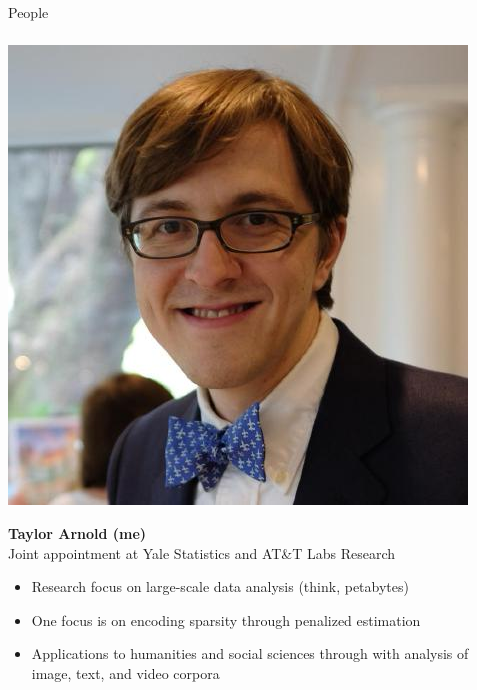 \begin{frame}[fragile] \frametitle{}

\begin{flushright}
{\color{yaleblue}\sc\fontsize{1cm}{0cm}\selectfont People}
\end{flushright}

\end{frame}

\begin{frame}[fragile] \frametitle{}

\noindent
\begin{minipage}{0.4\textwidth}
\includegraphics[width=0.9\linewidth]{img/arnold.jpeg}
\end{minipage}%
\begin{minipage}{0.6\textwidth}
{\bf Taylor Arnold (me)} \\
Joint appointment at Yale Statistics and AT\&T Labs Research
\begin{itemize}
\item Research focus on large-scale data analysis (think, petabytes)
\item One focus is on encoding sparsity through penalized estimation
\item Applications to humanities and social sciences through with
analysis of image, text, and video corpora
\end{itemize}
\end{minipage}
\end{frame}

